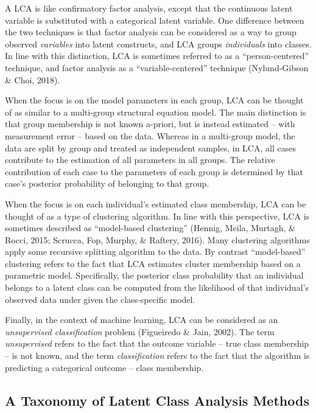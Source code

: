 \documentclass[
  ,man,floatsintext]{apa6}
\begin{document}
A LCA is like confirmatory factor analysis,
except that the continuous latent variable is substituted with a categorical latent variable.
One difference between the two techniques is that
factor analysis can be considered as a way to group observed \emph{variables} into latent constructs,
and LCA groups \emph{individuals} into classes.
In line with this distinction, LCA is sometimes referred to as a ``person-centered'' technique,
and factor analysis as a ``variable-centered'' technique (Nylund-Gibson \& Choi, 2018).

When the focus is on the model parameters in each group,
LCA can be thought of as similar to a multi-group structural equation model.
The main distinction is that group membership is not known a-priori,
but is instead estimated -- with measurement error -- based on the data.
Whereas in a multi-group model, the data are split by group and treated as independent samples,
in LCA, all cases contribute to the estimation of all parameters in all groups.
The relative contribution of each case to the parameters of each group
is determined by that case's posterior probability of belonging to that group.

When the focus is on each individual's estimated class membership,
LCA can be thought of as a type of clustering algorithm.
In line with this perspective, LCA is sometimes described as ``model-based
clustering'' (Hennig, Meila, Murtagh, \& Rocci, 2015; Scrucca, Fop, Murphy, \& Raftery, 2016).
Many clustering algorithms apply some recursive splitting algorithm to the data.
By contrast ``model-based'' clustering refers to the fact that LCA
estimates cluster membership based on a parametric model.
Specifically, the posterior class probability that an individual belongs to a latent class
can be computed from the likelihood of that individual's observed data under given the class-specific model.

Finally, in the context of machine learning, LCA can be considered as an
\emph{unsupervised classification} problem (Figueiredo \& Jain, 2002).
The term \emph{unsupervised} refers to the fact that the outcome variable
-- true class membership -- is not known,
and the term \emph{classification} refers to the fact that
the algorithm is predicting a categorical outcome -- class membership.

\hypertarget{a-taxonomy-of-latent-class-analysis-methods}{%
\subsection{A Taxonomy of Latent Class Analysis Methods}\label{a-taxonomy-of-latent-class-analysis-methods}}
\end{document}
